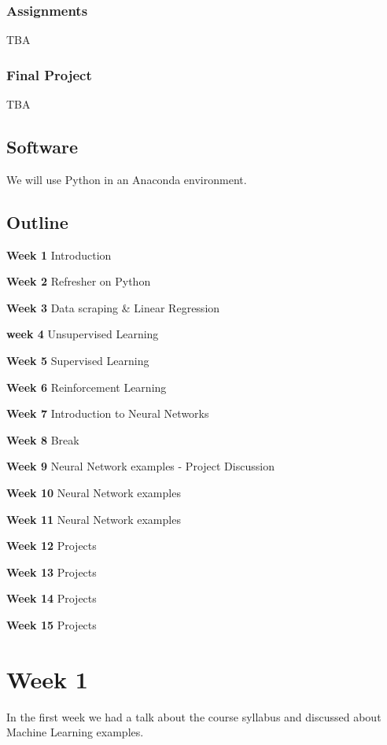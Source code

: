 \documentclass[]{book}
\begin{document}
\subsection{Assignments}\label{assignments}

TBA

\subsection{Final Project}\label{final-project}

TBA

\section{Software}\label{software}

We will use Python in an Anaconda environment.

\section{Outline}\label{outline}

\textbf{Week 1} Introduction

\textbf{Week 2} Refresher on Python

\textbf{Week 3} Data scraping \& Linear Regression

\textbf{week 4} Unsupervised Learning

\textbf{Week 5} Supervised Learning

\textbf{Week 6} Reinforcement Learning

\textbf{Week 7} Introduction to Neural Networks

\textbf{Week 8} Break

\textbf{Week 9} Neural Network examples - Project Discussion

\textbf{Week 10} Neural Network examples

\textbf{Week 11} Neural Network examples

\textbf{Week 12} Projects

\textbf{Week 13} Projects

\textbf{Week 14} Projects

\textbf{Week 15} Projects

\chapter{Week 1}\label{week-1}

In the first week we had a talk about the course syllabus and discussed
about Machine Learning examples.
\end{document}
